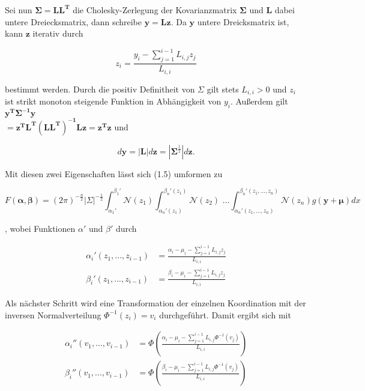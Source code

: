 \documentclass[12pt,a4paper]{scrartcl}
\numberwithin{equation}{section}
\begin{document}
Sei nun $\mathbf{\Sigma = L L^T}$ die Cholesky-Zerlegung der Kovarianzmatrix $\mathbf{\Sigma}$ und $\mathbf{L}$ dabei untere Dreiecksmatrix, dann schreibe $\mathbf{y = Lz}$. Da 
$\mathbf{y}$ untere Dreicksmatrix ist, kann $\mathbf{z}$ iterativ durch 

\begin{equation}
 z_i = \frac{y_i - \sum_{j=1}^{i-1} L_{i,j}z_j}{L_{i,i}}
\end{equation}

bestimmt werden. Durch die positiv Definitheit von $\Sigma$ gilt stets $L_{i,i} > 0$ und $z_i$ ist strikt monoton steigende Funktion in Abhängigkeit von $y_i$.
Außerdem gilt $\mathbf{y^T\Sigma^{-1}y}$ \\ $ \mathbf{= z^TL^T(LL^T)^{-1}Lz} = \mathbf{z^Tz} $ und 

\begin{equation}
 d\mathbf{y} = |\mathbf{L}|d \mathbf{z} = |\mathbf{\Sigma}^{\frac{1}{2}}| d \mathbf{z}.
\end{equation}

Mit diesen zwei Eigenschaften lässt sich (1.5) umformen zu 

\begin{equation}
  F(\mathbf{\alpha},\mathbf{\beta}) = (2\pi)^{-\frac{n}{2}} |\Sigma|^{-\frac{1}{2}} \int_{\alpha_1'}^{\beta_1'} \mathcal{N}(z_1) \int_{\alpha_n'(z_1)}^{\beta_n'(z_1)} \mathcal{N}(z_2) \text{ ...} \int_{\alpha_n'(z_1,...,z_n)}^{\beta_n'(z_1,...,z_n)} \mathcal{N}(z_n) g(\mathbf{y} + \mathbf{\mu}) dx
\end{equation}

, wobei Funktionen $\alpha'$ und $\beta'$ durch 

\begin{equation}
  \begin{split}
    \alpha_i'(z_1,...,z_{i-1})  &=  \frac{\alpha_i - \mu_i - \sum_{j=1}^{i-1} L_{i,j}z_j}{L_{i,i}} \\
    \beta_i'(z_1,...,z_{i-1})   &=  \frac{\beta_i - \mu_i - \sum_{j=1}^{i-1} L_{i,j}z_j}{L_{i,i}} 
  \end{split}
\end{equation}

Als nächster Schritt wird eine Transformation der einzelnen Koordination mit der inversen Normalverteilung $\Phi^{-1}(z_i) = v_i$ durchgeführt. Damit ergibt sich mit

\begin{equation}
\begin{split}
 \alpha_i''(v_1,...,v_{i-1})&=  \Phi (\frac{\alpha_i - \mu_i - \sum_{j=1}^{i-1} L_{i,j}\Phi^{-1}(v_j)}{L_{i,i}} )\\
 \beta_i''(v_1,...,v_{i-1})&=  \Phi(\frac{\beta_i - \mu_i - \sum_{j=1}^{i-1} L_{i,j}\Phi^{-1}(v_j)}{L_{i,i}} )
 \end{split}
\end{equation}
\end{document}
